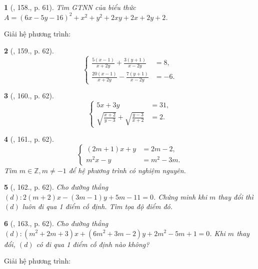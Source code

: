 \documentclass{article}
\newtheorem{baitoan}{}
\begin{document}
\begin{baitoan}[\cite{Tuyen_Toan_9_old}, 158., p. 61]
	Tìm {\rm GTNN} của biểu thức $A = (6x - 5y - 16)^2 + x^2 + y^2 + 2xy + 2x + 2y + 2$.
\end{baitoan}
Giải hệ phương trình:

\begin{baitoan}[\cite{Tuyen_Toan_9_old}, 159., p. 62]
	\begin{equation*}
		\left\{\begin{split}
			\frac{5(x - 1)}{x + 2y} + \frac{3(y + 1)}{x - 2y} &= 8,\\
			\frac{20(x - 1)}{x + 2y} - \frac{7(y + 1)}{x - 2y} &= -6.
		\end{split}\right.
	\end{equation*}
\end{baitoan}

\begin{baitoan}[\cite{Tuyen_Toan_9_old}, 160., p. 62]
	\begin{equation*}
		\left\{\begin{split}
			5x + 3y &= 31,\\
			\sqrt{\frac{x + 2}{y - 3}} + \sqrt{\frac{y - 3}{x + 2}} &= 2.
		\end{split}\right.
	\end{equation*}
\end{baitoan}

\begin{baitoan}[\cite{Tuyen_Toan_9_old}, 161., p. 62]
	\begin{equation*}
		\left\{\begin{split}
			(2m + 1)x + y &= 2m - 2,\\
			m^2x - y &= m^2 - 3m.
		\end{split}\right.
	\end{equation*}
	Tìm $m\in\mathbb{Z},m\ne-1$ để hệ phương trình có nghiệm nguyên.
\end{baitoan}

\begin{baitoan}[\cite{Tuyen_Toan_9_old}, 162., p. 62]
	Cho đường thẳng $(d):2(m + 2)x - (3m - 1)y + 5m - 11 = 0$. Chứng minh khi $m$ thay đổi thì $(d)$ luôn đi qua 1 điểm cố định. Tìm tọa độ điểm đó.
\end{baitoan}

\begin{baitoan}[\cite{Tuyen_Toan_9_old}, 163., p. 62]
	Cho đường thẳng $(d):(m^2 + 2m + 3)x + (6m^2 + 3m - 2)y + 2m^2 - 5m + 1 = 0$. Khi $m$ thay đổi, $(d)$ có đi qua 1 điểm cố định nào không?
\end{baitoan}
Giải hệ phương trình:
\end{document}
